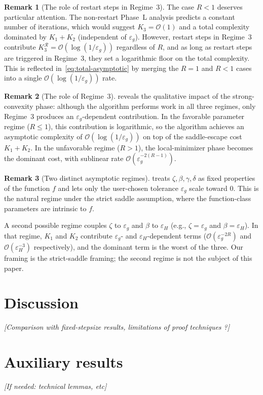\documentclass[11pt,a4paper]{article}
\theoremstyle{plain}
\theoremstyle{definition}
\newtheorem{remark}{Remark}
\newcommand{\eps}{\varepsilon}
\newcommand{\epsg}{\eps_{g}}
\newcommand{\epsH}{\eps_{H}}
\newcommand{\setR}{\mathcal{R}}
\begin{document}
\begin{remark}[The role of restart steps in Regime~3]\label{rem:total-r3-restart}
The case $R < 1$ deserves particular attention. The non-restart Phase~L analysis predicts a constant number of iterations, which would suggest $K_{3} = \mathcal{O}(1)$ and a total complexity dominated by $K_{1} + K_{2}$ (independent of $\epsg$). However, restart steps in Regime~3 contribute $K_{3}^{\setR} = \mathcal{O}(\log(1/\epsg))$ regardless of $R$, and as long as restart steps are triggered in Regime~3, they set a logarithmic floor on the total complexity. This is reflected in~\eqref{eq:total-asymptotic} by merging the $R = 1$ and $R < 1$ cases into a single $\mathcal{O}(\log(1/\epsg))$ rate.
\end{remark}

\begin{remark}[The role of Regime~3]\label{rem:total-r3-role}
 reveals the qualitative impact of the strong-convexity phase: although the algorithm performs work in all three regimes, only Regime~3 produces an $\epsg$-dependent contribution. In the favorable parameter regime ($R \leq 1$), this contribution is logarithmic, so the algorithm achieves an asymptotic complexity of $\mathcal{O}(\log(1/\epsg))$ on top of the saddle-escape cost $K_{1} + K_{2}$. In the unfavorable regime ($R > 1$), the local-minimizer phase becomes the dominant cost, with sublinear rate $\mathcal{O}(\epsg^{-2(R-1)})$.
\end{remark}

\begin{remark}[Two distinct asymptotic regimes]\label{rem:total-asymptotic-regimes}
 treats $\zeta, \beta, \gamma, \delta$ as fixed properties of the function $f$ and lets only the user-chosen tolerance $\epsg$ scale toward $0$. This is the natural regime under the strict saddle assumption, where the function-class parameters are intrinsic to $f$.

A second possible regime couples $\zeta$ to $\epsg$ and $\beta$ to $\epsH$ (e.g., $\zeta = \epsg$ and $\beta = \epsH$). In that regime, $K_{1}$ and $K_{2}$ contribute $\epsg$- and $\epsH$-dependent terms ($\mathcal{O}(\epsg^{-2R})$ and $\mathcal{O}(\epsH^{-3})$ respectively), and the dominant term is the worst of the three. Our framing is the strict-saddle framing; the second regime is not the subject of this paper.
\end{remark}



\section{Discussion}\label{sec:discussion}


\textit{[Comparison with fixed-stepsize results, limitations of proof techniques ?]}


\appendix
\section{Auxiliary results}\label{app:aux}

\textit{[If needed: technical lemmas, etc]}



\end{document}
